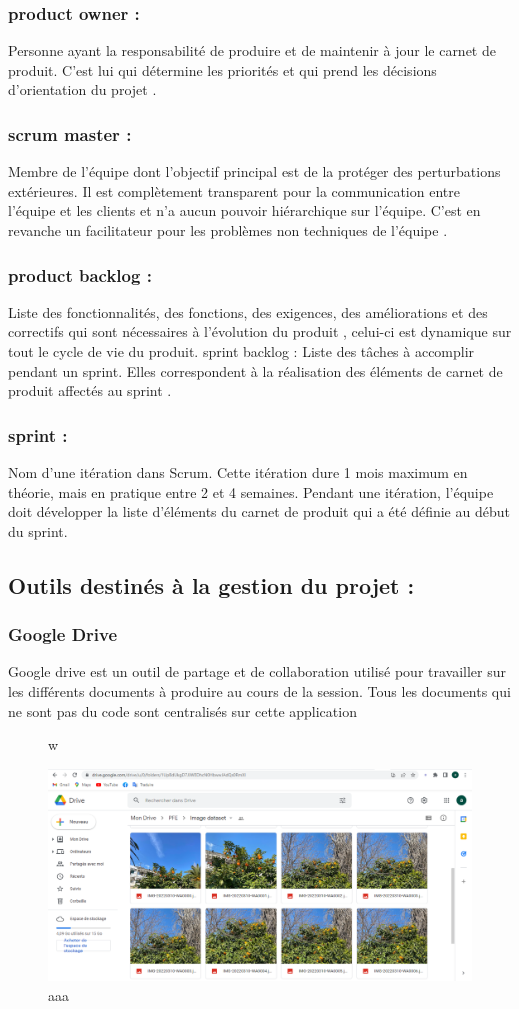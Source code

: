 \documentclass[a4paper,12pt]{report}
\begin{document}
	\subsubsection{product owner :}
	Personne ayant la responsabilité de produire et de maintenir à jour le carnet de produit. C'est lui qui détermine les priorités et qui prend les décisions d'orientation du projet .
	\subsubsection{scrum master  :}
	Membre de l'équipe dont l'objectif principal est de la protéger des perturbations extérieures. Il est complètement transparent pour la communication entre l'équipe et les clients et n'a aucun pouvoir hiérarchique sur l'équipe. C'est en revanche un facilitateur pour les problèmes non techniques de l'équipe .
	\subsubsection{product backlog  :}
	Liste des fonctionnalités, des fonctions, des exigences, des améliorations et des correctifs qui sont nécessaires à l'évolution du produit , celui-ci est dynamique sur tout le cycle de vie du produit.
	sprint backlog  :
	Liste des tâches à accomplir pendant un sprint. Elles correspondent à la réalisation des éléments de carnet de produit affectés au sprint .
	\subsubsection{sprint :}
	Nom d'une itération dans Scrum. Cette itération dure 1 mois maximum en théorie, mais en pratique entre 2 et 4 semaines. Pendant une itération, l'équipe doit développer la liste d'éléments du carnet de produit qui a été définie au début du sprint.
	\subsection{Outils destinés à la gestion du projet :}
	\subsubsection{Google Drive}
	Google drive est un outil de partage et de collaboration utilisé pour travailler sur les différents
	documents à produire au cours de la session. Tous les documents qui ne sont pas du code sont
	centralisés sur cette application
	\begin{figure} [h]w
		\begin{center}
			\centering
		\includegraphics[width=0.7\linewidth]{Images/2022-04-09 (7)}
		\end{center}
		\caption{aaa}
	\end{figure}
	\newpage
\end{document}
